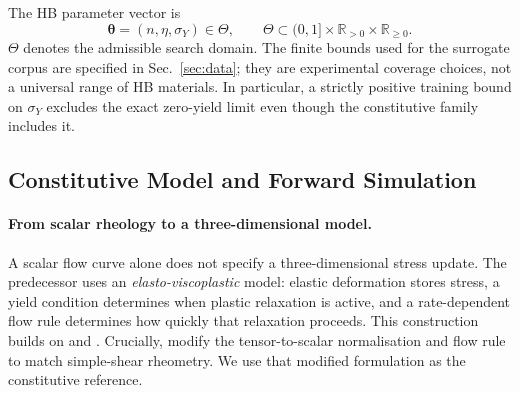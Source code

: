 The HB parameter vector is
\begin{equation}
\label{eq:hb-parameter-domain}
    \boldsymbol{\theta}=(n,\eta,\sigma_Y)\in\Theta,
    \qquad
    \Theta\subset(0,1]\times\mathbb{R}_{>0}\times\mathbb{R}_{\geq0}.
\end{equation}
$\Theta$ denotes the admissible search domain. The finite bounds used
for the surrogate corpus are specified in Sec.~\ref{sec:data}; they
are experimental coverage choices, not a universal range of HB
materials. In particular, a strictly positive training bound on
$\sigma_Y$ excludes the exact zero-yield limit even though the
constitutive family includes it.

\subsection{Constitutive Model and Forward Simulation}
\label{sec:constitutive-reference}
\label{sec:mpm-forward}

\paragraph{From scalar rheology to a three-dimensional model.}
A scalar flow curve alone does not specify a three-dimensional stress
update. The predecessor uses an \emph{elasto-viscoplastic} model:
elastic deformation stores stress, a yield condition determines when
plastic relaxation is active, and a rate-dependent flow rule determines
how quickly that relaxation proceeds. This construction builds on
\citet{yue2015continuum} and \citet{nagasawa2019mixing}.
Crucially, \citet{hamamichi2023nonnewtonian} modify the tensor-to-scalar
normalisation and flow rule to match simple-shear rheometry. We use
that modified formulation as the constitutive reference.

